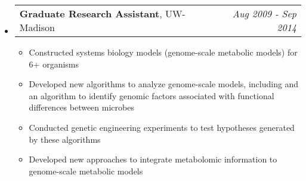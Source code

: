 \documentclass[letterpaper,10pt]{article}
\makeatletter
\newcommand{\ressubheadingSingular}[2]{
\begin{tabular*}{7in}{l@{\cftdotfill{\cftsecdotsep}\extracolsep{\fill}}r}
		#1 & \textit{#2} \\
\end{tabular*}\vspace{-6pt}}
\makeatother
\begin{document}
\begin{itemize}
\begin{itemize}
		\end{itemize}
	\item
		\ressubheadingSingular{\textbf{Graduate Research Assistant}, UW-Madison}{Aug 2009 - Sep 2014}		
		\begin{itemize}
			\item Constructed systems biology models (genome-scale metabolic models) for 6+ organisms
			\item Developed new algorithms to analyze genome-scale models, including and an algorithm to identify genomic factors associated with functional differences between microbes
			\item Conducted genetic engineering experiments to test hypotheses generated by these algorithms
			\item Developed new approaches to integrate metabolomic information to genome-scale metabolic models

\end{itemize}
\end{itemize}
\end{document}
